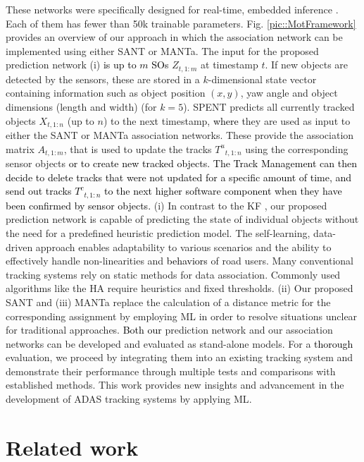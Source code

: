 \documentclass[letterpaper, 10 pt, journal, twoside]{IEEEtran}
\newcommand{\red}[1]{\textcolor{black}{#1}}
\begin{document}
These networks were specifically designed for real-time, embedded inference \red{{\cite{DL_TinyML.2019}}}. Each of them has fewer than 50k trainable parameters. Fig. {\ref{pic::MotFramework}} provides an overview of our approach in which the association network can be implemented using either \ac{SANT} or \ac{MANTa}.
The input for the proposed prediction network (i) \red{is up to $m$ \acp{SO}} $Z_{t,1:m}$ at timestamp $t$.
If new objects are detected by the sensors, these are stored in a $k$-dimensional state vector containing information such as object position $(x,y)$, yaw angle and object dimensions
(length and width) (for $k=5$).
\ac{SPENT} predicts all currently tracked objects $X_{t,1:n}$ (up to $n$) to the next timestamp, \red{where} they are used as input to either the SANT or MANTa association networks.
These provide the association matrix $A_{t,1:m}$, that is used to update the tracks ${T^u}_{t,1:n}$ using the corresponding sensor objects \red{or to create new tracked objects.}
\red{The Track Management can then decide to delete tracks that were not updated for a specific amount of time, and send out tracks ${T^c}_{t,1:n}$ to the next higher software component when they have been confirmed by sensor objects.}
(i) In contrast to the \ac{KF} {\cite{KF_BoundingBD.2023}}, our proposed prediction network is capable of predicting the state of individual objects without the need for a predefined heuristic prediction model. %
The self-learning, data-driven approach enables adaptability to various scenarios and the ability to effectively handle non-linearities and \red{behaviors} of road users.
Many conventional tracking systems rely on static methods for data association.
Commonly used algorithms like the \ac{HA} {\cite{DA_hungarian.1955}} require heuristics and fixed thresholds.
(ii) Our proposed \ac{SANT} and (iii) \ac{MANTa} replace the calculation of a distance metric for the corresponding assignment by employing \ac{ML} in order to resolve situations unclear for traditional approaches.
\red{Both our} prediction network and our association networks can be developed and evaluated as stand-alone models.
For a \red{thorough} evaluation, we proceed by integrating them into an existing tracking system and demonstrate their performance through multiple tests and comparisons with established methods.
This work provides new insights and advancement in the development of \ac{ADAS} tracking systems by applying \ac{ML}\@.

\section{Related work}
\end{document}
